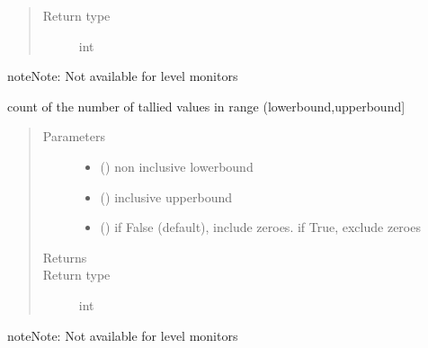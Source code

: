 \documentclass[letterpaper,10pt,english]{sphinxmanual}
\begin{document}
\begin{fulllineitems}
\begin{fulllineitems}
\begin{quote}
\begin{description}
\item[{Return type}] \leavevmode
int

\end{description}\end{quote}

\begin{sphinxadmonition}{note}{Note:}
Not available for level monitors
\end{sphinxadmonition}

\end{fulllineitems}


\begin{fulllineitems}
\label{\detokenize{Reference:salabim.Monitor.bin_number_of_entries}}
count of the number of tallied values in range (lowerbound,upperbound{]}
\begin{quote}\begin{description}
\item[{Parameters}] \leavevmode\begin{itemize}
\item {} 
 () \textendash{} non inclusive lowerbound

\item {} 
 () \textendash{} inclusive upperbound

\item {} 
 () \textendash{} if False (default), include zeroes. if True, exclude zeroes

\end{itemize}

\item[{Returns}] \leavevmode
{}

\item[{Return type}] \leavevmode
int

\end{description}\end{quote}

\begin{sphinxadmonition}{note}{Note:}
Not available for level monitors
\end{sphinxadmonition}


\end{fulllineitems}
\end{fulllineitems}
\end{document}
